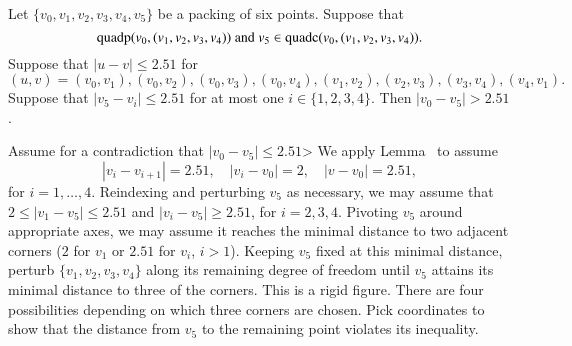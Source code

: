 \begin{tarskidata}
\begin{tarski}

\begin{lemma}
Let $\{v_0,v_1,v_2,v_3,v_4,v_5\}$ be a packing of six points.
Suppose that 
  $${\operatorname{quadp}}(v_0,(v_1,v_2,v_3,v_4)) \text{ and }
   v_5\in {\operatorname{quadc}}(v_0,(v_1,v_2,v_3,v_4)).$$
Suppose that $|u-v|\le 2.51$ for
  $$(u,v)=(v_0,v_1), (v_0,v_2), (v_0,v_3), (v_0,v_4), 
  (v_1,v_2), (v_2,v_3), (v_3,v_4), (v_4,v_1).$$
Suppose that
$|v_5-v_i|\le 2.51$ for at most one $i\in\{1,2,3,4\}$.  Then
$|v_0-v_5| > 2.51$.
\end{lemma}



\begin{proved} Assume for a contradiction that $|v_0-v_5|\le2.51$>
We apply Lemma~ to assume
    $$|v_i-v_{i+1}|=2.51,\quad |v_i-v_0|=2, \quad |v-v_0|=2.51,$$
for $i=1,\ldots,4$. Reindexing and perturbing $v_5$ as necessary, we
may assume that $2\le |v_1-v_5|\le2.51$ and $|v_i-v_5|\ge2.51$, for
$i=2,3,4$.  Pivoting $v_5$ around appropriate axes, 
we may assume it reaches the minimal
distance to two adjacent corners ($2$ for $v_1$ or $2.51$ for
$v_i$, $i>1$).  Keeping $v_5$ fixed at this minimal distance,
perturb $\{v_1,v_2,v_3,v_4\}$ along its remaining degree of freedom
until $v_5$ attains its minimal distance to three of the corners.
This is a rigid figure.  There are four possibilities depending on
which three corners are chosen. Pick coordinates to show that the
distance from $v_5$ to the remaining point violates its inequality.
\swallowed\end{proved}
\end{tarski}





\begin{tarski}


\end{tarski}
\end{tarskidata}
